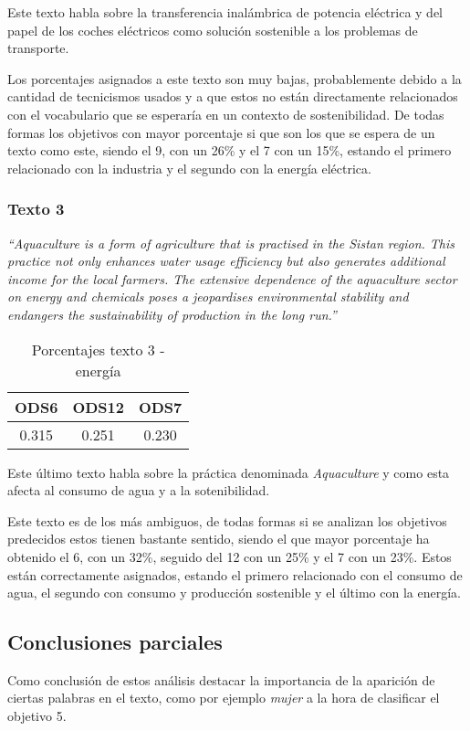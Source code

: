 Este texto habla sobre la transferencia inalámbrica de potencia eléctrica y del
papel de los coches eléctricos como solución sostenible a los problemas de
transporte.

Los porcentajes asignados a este texto son muy bajas, probablemente debido a la
cantidad de tecnicismos usados y a que estos no están directamente relacionados
con el vocabulario que se esperaría en un contexto de sostenibilidad. De todas
formas los objetivos con mayor porcentaje si que son los que se espera de un
texto como este, siendo el 9, con un 26\% y el 7 con un 15\%, estando el primero
relacionado con la industria y el segundo con la energía eléctrica.

\subsubsection{Texto 3}
\begin{center}
    \textit{``Aquaculture is a form of agriculture that is practised in the
    Sistan region. This practice not only enhances water usage efficiency but
    also generates additional income for the local farmers. The extensive
    dependence of the aquaculture sector on energy and chemicals poses a
    jeopardises environmental stability and endangers the sustainability of
    production in the long run.''}\cite{validationtexts10}
    \begin{table}[H]
        \begin{tabular}{c | c | c }
            \hline
            ODS6 & ODS12 & ODS7\\ \hline
            0.315 & 0.251 & 0.230\\ \hline
        \end{tabular}
        \caption{Porcentajes texto 3 - energía}
\end{table}
\end{center}

Este último texto habla sobre la práctica denominada \textit{Aquaculture} y como
esta afecta al consumo de agua y a la sotenibilidad.

Este texto es de los más ambiguos, de todas formas si se analizan los objetivos
predecidos estos tienen bastante sentido, siendo el que mayor porcentaje ha
obtenido el 6, con un 32\%, seguido del 12 con un 25\% y el 7 con un 23\%. Estos
están correctamente asignados, estando el primero relacionado con el consumo de
agua, el segundo con consumo y producción sostenible y el último con la energía.

\subsection{Conclusiones parciales}
Como conclusión de estos análisis destacar la importancia de la aparición de
ciertas palabras en el texto, como por ejemplo \textit{mujer} a la hora de
clasificar el objetivo 5. 

